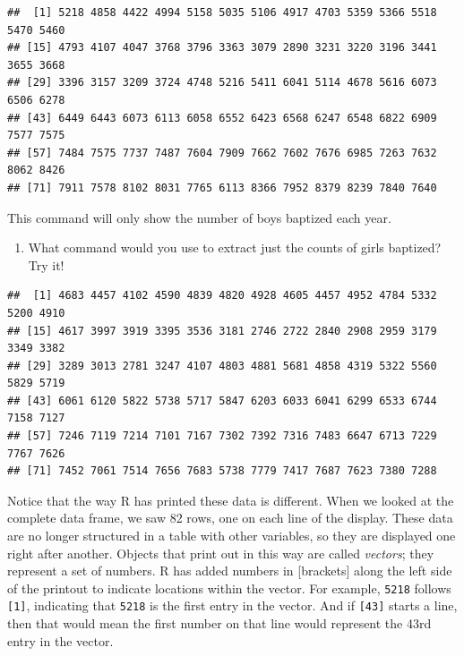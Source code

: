 \documentclass[]{article}
\newenvironment{Shaded}{\begin{snugshade}}{\end{snugshade}}
\newcommand{\OperatorTok}[1]{\textcolor[rgb]{0.81,0.36,0.00}{\textbf{#1}}}
\newcommand{\NormalTok}[1]{#1}
\providecommand{\tightlist}{%
  \setlength{\itemsep}{0pt}\setlength{\parskip}{0pt}}
\begin{document}
\begin{Shaded}
\end{Shaded}

\begin{verbatim}
##  [1] 5218 4858 4422 4994 5158 5035 5106 4917 4703 5359 5366 5518 5470 5460
## [15] 4793 4107 4047 3768 3796 3363 3079 2890 3231 3220 3196 3441 3655 3668
## [29] 3396 3157 3209 3724 4748 5216 5411 6041 5114 4678 5616 6073 6506 6278
## [43] 6449 6443 6073 6113 6058 6552 6423 6568 6247 6548 6822 6909 7577 7575
## [57] 7484 7575 7737 7487 7604 7909 7662 7602 7676 6985 7263 7632 8062 8426
## [71] 7911 7578 8102 8031 7765 6113 8366 7952 8379 8239 7840 7640
\end{verbatim}

This command will only show the number of boys baptized each year.

\begin{enumerate}
\def\labelenumi{\arabic{enumi}.}
\tightlist
\item
  What command would you use to extract just the counts of girls
  baptized? Try it!
\end{enumerate}

\begin{Shaded}
\end{Shaded}

\begin{verbatim}
##  [1] 4683 4457 4102 4590 4839 4820 4928 4605 4457 4952 4784 5332 5200 4910
## [15] 4617 3997 3919 3395 3536 3181 2746 2722 2840 2908 2959 3179 3349 3382
## [29] 3289 3013 2781 3247 4107 4803 4881 5681 4858 4319 5322 5560 5829 5719
## [43] 6061 6120 5822 5738 5717 5847 6203 6033 6041 6299 6533 6744 7158 7127
## [57] 7246 7119 7214 7101 7167 7302 7392 7316 7483 6647 6713 7229 7767 7626
## [71] 7452 7061 7514 7656 7683 5738 7779 7417 7687 7623 7380 7288
\end{verbatim}

Notice that the way R has printed these data is different. When we
looked at the complete data frame, we saw 82 rows, one on each line of
the display. These data are no longer structured in a table with other
variables, so they are displayed one right after another. Objects that
print out in this way are called \emph{vectors}; they represent a set of
numbers. R has added numbers in {[}brackets{]} along the left side of
the printout to indicate locations within the vector. For example,
\texttt{5218} follows \texttt{{[}1{]}}, indicating that \texttt{5218} is
the first entry in the vector. And if \texttt{{[}43{]}} starts a line,
then that would mean the first number on that line would represent the
43rd entry in the vector.
\end{document}
